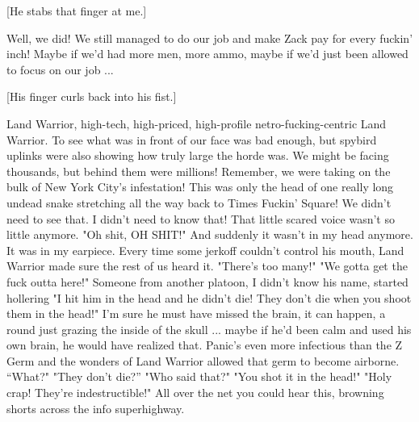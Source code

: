\documentclass[10pt,a4paper]{article}
\begin{document}
[He stabs that finger at me.]

Well, we did! We still managed to do our job and make Zack pay for every fuckin' inch! Maybe if we'd had more men, more ammo, maybe if we'd just been allowed to focus on our job ...

[His finger curls back into his fist.]

Land Warrior, high-tech, high-priced, high-profile netro-fucking-centric Land Warrior. To see what was in front of our face was bad enough, but spybird uplinks were also showing how truly large the horde was. We might be facing thousands, but behind them were millions! Remember, we were taking on the bulk of New York City's infestation! This was only the head of one really long undead snake stretching all the way back to Times Fuckin' Square! We didn't need to see that. I didn't need to know that! That little scared voice wasn't so little anymore. "Oh shit, OH SHIT!" And suddenly it wasn’t in my head anymore. It was in my earpiece. Every time some jerkoff couldn't control his mouth, Land Warrior made sure the rest of us heard it. "There's too many!" "We gotta get the fuck outta here!" Someone from another platoon, I didn't know his name, started hollering "I hit him in the head and he didn't die! They don't die when you shoot them in the head!" I'm sure he must have missed the brain, it can happen, a round just grazing the inside of the skull ... maybe if he'd been calm and used his own brain, he would have realized that. Panic's even more infectious than the Z Germ and the wonders of Land Warrior allowed that germ to become airborne. “What?" "They don't die?” "Who said that?" "You shot it in the head!" "Holy crap! They're indestructible!" All over the net you could hear this, browning shorts across the info superhighway.
\end{document}
